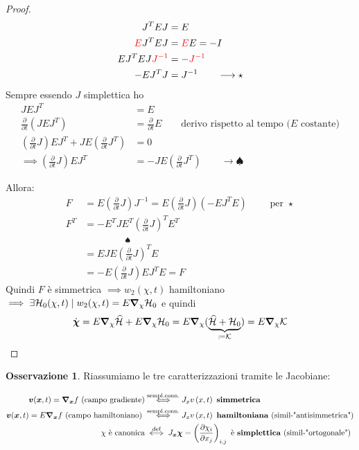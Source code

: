 \documentclass[a4paper,10pt]{article}
\theoremstyle{definition}
\newcommand{\bv}{\boldsymbol} %
\theoremstyle{indentdefinition}
\theoremstyle{indenttheorem}
\theoremstyle{myremark}
\newtheorem*{rem*}{Osservazione}
\theoremstyle{indentgeneral}
\begin{document}
\begin{proof}
\begin{align*}
    J^{T}EJ&=E \\
    \textcolor{red}{E} J^{T}EJ&=\textcolor{red}{E}E=-I \\
     EJ^{T}EJ\textcolor{red}{J^{-1}}&=-\textcolor{red}{J^{-1}} \\
     -EJ^TJ&=J^{-1} \qquad\longrightarrow\star
\end{align*}
Sempre essendo $J$ simplettica ho
\begin{align*}
    JEJ^{T}&=E \\
    \frac{\partial}{\partial t} (JEJ^T)&= \frac{\partial}{\partial t}E \qquad\text{derivo rispetto al tempo ($E$ costante)} \\
    \left(\frac{\partial}{\partial t}J\right)EJ^{T}+JE\left(\frac{\partial}{\partial t}J^{T}\right)&=0 \\
    \implies  \left(\frac{\partial}{\partial t}J\right)EJ^{T}&=-JE\left(\frac{\partial}{\partial t}J^{T}\right) \qquad\longrightarrow\spadesuit
\end{align*}

Allora:
\begin{align*}
F &=E\left(\frac{\partial}{\partial t}J\right)J^{-1}=E\left(\frac{\partial}{\partial t}J\right)\left(-EJ^{T}E\right) \qquad\text{ per }\star\\
F^{T} &=-E^TJE^T\left(\frac{\partial}{\partial t}J\right)^{T}E^T\\
&= E\overset{\spadesuit}{\boxed{JE\left(\frac{\partial}{\partial t}J\right)^{T}}}E\\
&=-E\left(\frac{\partial}{\partial t}J\right)\boxed{EJ^{T}E}=F 
\end{align*}
Quindi $F$ è simmetrica $\implies w_2(\chi,t)$ hamiltoniano $\implies \exists\mathcal{H}_0(\chi,t)\mid w_2(\chi,t)=E\grad_\chi\mathcal{H}_0$ e quindi
$$\dot{\bv{\chi}}=E\grad_\chi \widehat{\mathcal{H}}+E\grad_\chi\mathcal{H}_0=E\grad_\chi(\underbrace{\widehat{\mathcal{H}}+\mathcal{H}_0}_{\coloneqq\mathcal{K}})=E\grad_\chi\mathcal{K}$$
\end{proof}

\begin{rem*}
    Riassumiamo le tre caratterizzazioni tramite le Jacobiane:
 
    \begin{align*}
        \bv{v}(\bv{x},t)=\grad_{\bv{x}}f \text{ (campo gradiente)} &\overset{\text{sempl.conn.}}{\iff}   J_{x}v\left(x,t\right) \text{ \textbf{simmetrica}}  \\
         \bv{v}(\bv{x},t)=E\grad_{\bv{x}}f \text{ (campo hamiltoniano) } &\overset{\text{sempl.conn.}}{\iff}  J_{x}v\left(x,t\right) \text{ \textbf{hamiltoniana} (simil-"antisimmetrica")}  \\
         \chi \text{ è canonica} &\overset{\text{def}}{\iff} J_{\bv{x}}\bv{\chi}=\left(\frac{\partial\chi_{i}}{\partial x_{j}}\right)_{i,j} \text{ è \textbf{simplettica} (simil-"ortogonale")}
    \end{align*}
\end{rem*}
\end{document}
